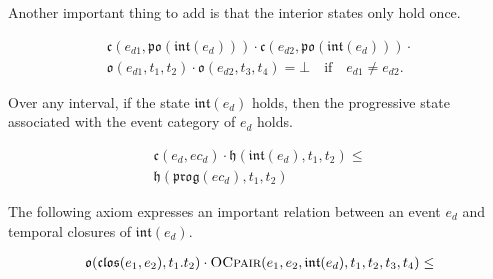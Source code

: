 Another important thing to add is that the interior states only hold once.

\begin{axiom}\label{ax:int_once}
    \begin{equation}
        \begin{gathered}
            \mathfrak{c}(e_{d1}, \mathfrak{po}(\mathfrak{int}(e_d))) \cdot \mathfrak{c}(e_{d2}, \mathfrak{po}(\mathfrak{int}(e_d))) \cdot \\
            \mathfrak{o}(e_{d1}, t_1, t_2) \cdot \mathfrak{o}(e_{d2}, t_3, t_4) = \bot \quad \text{if} \quad e_{d1} \neq e_{d2}.
        \end{gathered}
    \end{equation}
\end{axiom}

Over any interval, if the state $\mathfrak{int}(e_d)$ holds, then the progressive state associated with the event category of $e_d$ holds.

\begin{axiom}\label{ax:int_progressive}
    \begin{equation}
        \begin{gathered}
            \mathfrak{c}(e_d, ec_d) \cdot \mathfrak{h}(\mathfrak{int}(e_d), t_1, t_2) \leq \\
            \mathfrak{h}(\mathfrak{prog}(ec_d), t_1, t_2)
        \end{gathered}
    \end{equation}
\end{axiom}

The following axiom expresses an important relation between an event $e_d$ and temporal closures of $\mathfrak{int}(e_d)$.

\begin{axiom}
    \begin{equation}
        \begin{gathered}
            \mathfrak{o}(\mathfrak{clos}(e_1, e_2), t_1. t_2) \cdot \textsc{OCpair}(e_1, e_2, \mathfrak{int}(e_d), t_1, t_2, t_3, t_4) \leq \\
        \end{gathered}
    \end{equation}
\end{axiom}